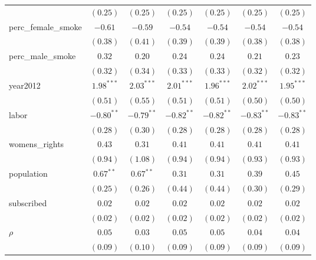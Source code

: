 \begin{table}[!h]
\begin{center}
\begin{tabular}{l c c c c c c }
                        & $(0.25)$     & $(0.25)$     & $(0.25)$     & $(0.25)$     & $(0.25)$     & $(0.25)$     \\
perc\_female\_smoke     & $-0.61$      & $-0.59$      & $-0.54$      & $-0.54$      & $-0.54$      & $-0.54$      \\
                        & $(0.38)$     & $(0.41)$     & $(0.39)$     & $(0.39)$     & $(0.38)$     & $(0.38)$     \\
perc\_male\_smoke       & $0.32$       & $0.20$       & $0.24$       & $0.24$       & $0.21$       & $0.23$       \\
                        & $(0.32)$     & $(0.34)$     & $(0.33)$     & $(0.33)$     & $(0.32)$     & $(0.32)$     \\
year2012                & $1.98^{***}$ & $2.03^{***}$ & $2.01^{***}$ & $1.96^{***}$ & $2.02^{***}$ & $1.95^{***}$ \\
                        & $(0.51)$     & $(0.55)$     & $(0.51)$     & $(0.51)$     & $(0.50)$     & $(0.50)$     \\
labor                   & $-0.80^{**}$ & $-0.79^{**}$ & $-0.82^{**}$ & $-0.82^{**}$ & $-0.83^{**}$ & $-0.83^{**}$ \\
                        & $(0.28)$     & $(0.30)$     & $(0.28)$     & $(0.28)$     & $(0.28)$     & $(0.28)$     \\
womens\_rights          & $0.43$       & $0.31$       & $0.41$       & $0.41$       & $0.41$       & $0.41$       \\
                        & $(0.94)$     & $(1.08)$     & $(0.94)$     & $(0.94)$     & $(0.93)$     & $(0.93)$     \\
population              & $0.67^{**}$  & $0.67^{**}$  & $0.31$       & $0.31$       & $0.39$       & $0.45$       \\
                        & $(0.25)$     & $(0.26)$     & $(0.44)$     & $(0.44)$     & $(0.30)$     & $(0.29)$     \\
subscribed              & $0.02$       & $0.02$       & $0.02$       & $0.02$       & $0.02$       & $0.02$       \\
                        & $(0.02)$     & $(0.02)$     & $(0.02)$     & $(0.02)$     & $(0.02)$     & $(0.02)$     \\
$\rho$                  & $0.05$       & $0.03$       & $0.05$       & $0.05$       & $0.04$       & $0.04$       \\
                        & $(0.09)$     & $(0.10)$     & $(0.09)$     & $(0.09)$     & $(0.09)$     & $(0.09)$     \\

\end{tabular}
\end{center}
\end{table}
